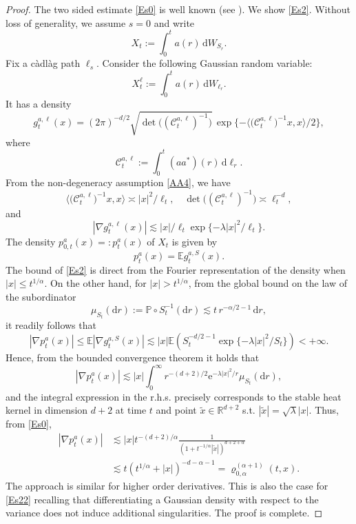 \documentclass[JEP,XML,SOM,Unicode,published]{cedram}
\newcommand{\rd}{\mathrm{d}}
\theoremstyle{plain}
\theoremstyle{definition}
\newcommand\e{\mathrm{e}}
\let\<\langle
\let\>\rangle
\newcommand\cC{{\mathcal C}}
\newcommand\mE{\mathbb{E}}
\newcommand\mP{\mathbb{P}}
\newcommand\mR{\mathbb{R}}
\newcommand\1{{\mathbf{1}}}
\newcommand{\dif}{\,\mathrm{d}}
\begin{document}
\begin{proof}
The two sided estimate \eqref{Es0} is well known (see \eg \cite{Ch-Zh1}).
We show \eqref{Es2}.
Without loss of generality, we assume $s=0$ and write
\[
X_{t}:=\int^t_0a(r)\dif W_{S_r}.
\]
Fix a càdlàg path $\ell_s$. Consider the following Gaussian random variable:
\[
X^\ell_{t}:=\int^t_0a(r)\dif W_{\ell_r}.
\]
It has a density
\begin{equation*}%
g^{a,\ell}_{t}(x)=(2\pi)^{-d/2}\sqrt{\det\bigl( (\cC_{t}^{a,\ell})^{-1}\bigr)}\,\exp\{-\<\bigl(\cC_t^{a,\ell}\bigr)^{-1}x,x\>/2\},
\end{equation*}
where
\[
\cC_t^{a,\ell}:=\int^t_0(aa^*)(r)\dif \ell_r.
\]
From the non-degeneracy assumption \eqref{AA4}, we have
\[
\<\bigl(\cC_t^{a,\ell}\bigr)^{-1}x,x\>\asymp|x|^2/\ell_t,\quad \det\bigl( (\cC_t^{a,\ell})^{-1}\bigr)\asymp \ell_t^{-d},
\]
and
\[
|\nabla g^{a,\ell}_{t}(x)|\lesssim |x|/\ell_t\exp\{-\lambda|x|^2/\ell_t\}.
\]
The density $p_{0,t}^{a}(x)=:p_{t}^{a}(x)$ of $X_{t}$ is given by
\begin{equation}\label{SUB_STABLE_DENS}
p_{t}^{a}(x)=\mE g^{a,S}_{t}(x).
\end{equation}
The bound of \eqref{Es2} is direct from the Fourier representation of the density when $|x|\le t^{1/\alpha}$.
On the other hand, for $|x|>t^{1/\alpha} $, from the global bound on the law of the subordinator
\[
\mu_{S_t}(\rd r):=\mP\circ S_t^{-1}(\rd r)\lesssim t\, r^{-\alpha/2-1}\dif r,
\]
it readily follows that
\begin{equation*}
|\nabla p_{t}^a(x)|\leq\mE |\nabla g^{a,S}_{t}(x)|
\lesssim|x|\mE(S_t^{-d/2-1}\exp\{-\lambda|x|^2/S_t\})<+\infty.
\end{equation*}
Hence, from the bounded convergence theorem it holds that
\begin{equation*}
|\nabla p_{t}^a(x)|\lesssim|x|\int^\infty_0 r^{-(d+2)/2}\e^{-\lambda |x|^2/r}\mu_{S_t}(\rd r),
\end{equation*}
and the integral expression in the r.h.s. precisely corresponds to the stable heat kernel in dimension $d+2$ at time $t$ and point $\tilde x\in \mR^{d+2} $ s.t. $|\tilde x|=\sqrt{\lambda}|x| $. Thus, from \eqref{Es0},
\begin{align*}
|\nabla p_{t}^a(x)|&\lesssim |x| t^{-(d+2)/\alpha}\frac{1}{(1+t^{-1/\alpha} |\tilde x|)^{d+2+\alpha}}\\
&\lesssim t(t^{1/\alpha}+|x|)^{-d-\alpha-1}=\varrho^{(\alpha+1)}_{0,\alpha}(t,x).
\end{align*}
The approach is similar for higher order derivatives. This is also the case for \eqref{Es22} recalling that differentiating a Gaussian density with respect to the variance does not induce additional singularities.
The proof is complete.
\end{proof}
\end{document}
